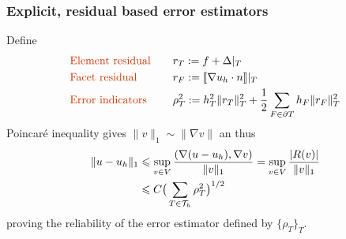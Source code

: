 \begin{frame}
  \frametitle{Explicit, residual based error estimators}
  Define
  \begin{alignat*}{3}
    &\text{\color{fenicsred}Element residual}\quad & & r_T := f + \Delta |_T \\
    &\text{\color{fenicsred}Facet residual}\quad & & r_F := \jump{\nabla u_h \cdot n} |_T \\
    &\text{\color{fenicsred}Error indicators} \quad  & &\rho_T^2 := h_T^2 \|r_T\|_T^2 +
    \dfrac{1}{2} \sum_{F \in \partial T} h_F \| r_F \|^2_T
  \end{alignat*}
  Poincar\'e inequality gives $\|v\|_1 \sim \| \nabla v \|$ an thus
  \begin{align*}
    \| u - u_h \|_1 &\leqslant \sup_{v \in V}\dfrac{(\nabla(u-u_h),\nabla v)}{\|
      v \|_1} = \sup_{v \in V} \dfrac{|R(v)|}{\|v\|_1}  \\
      & \leqslant C \big( \sum_{T \in \mathcal{T}_h} \rho_T^2 \big)^{1/2}
  \end{align*}
  proving the reliability of the error estimator defined by
  $\{\rho_T\}_T$.
\end{frame}

